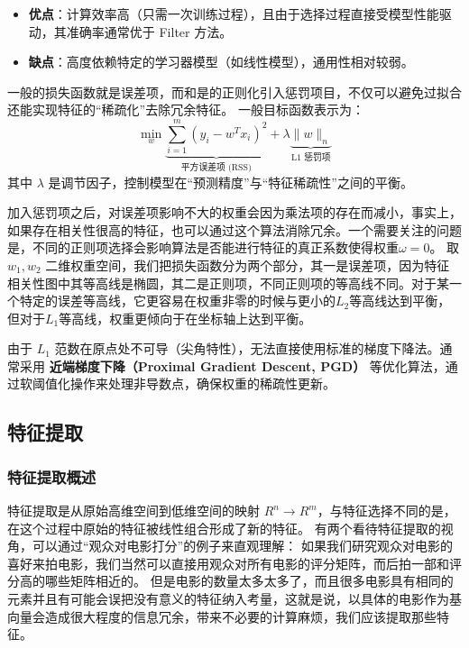 \begin{itemize}
    \item \textbf{优点}：计算效率高（只需一次训练过程），且由于选择过程直接受模型性能驱动，其准确率通常优于 Filter 方法。
    \item \textbf{缺点}：高度依赖特定的学习器模型（如线性模型），通用性相对较弱。
\end{itemize}

\begin{example}
    一般的损失函数就是误差项，而和是的正则化引入惩罚项目，不仅可以避免过拟合还能实现特征的“稀疏化”去除冗余特征。
    一般目标函数表示为：
    \[ \min_{w} \underbrace{\sum_{i=1}^{m} (y_i - w^T x_i)^2}_{\text{平方误差项 (RSS)}} + \lambda \underbrace{\|w\|_n}_{\text{L1 惩罚项}} \]
    其中 $\lambda$ 是调节因子，控制模型在“预测精度”与“特征稀疏性”之间的平衡。

    加入惩罚项之后，对误差项影响不大的权重会因为乘法项的存在而减小，事实上，如果存在相关性很高的特征，也可以通过这个算法消除冗余。一个需要关注的问题是，不同的正则项选择会影响算法是否能进行特征的真正系数使得权重$\omega = 0$。
    取$w_1, w_2$ 二维权重空间，我们把损失函数分为两个部分，其一是误差项，因为特征相关性图中其等高线是椭圆，其二是正则项，不同正则项的等高线不同。对于某一个特定的误差等高线，它更容易在权重非零的时候与更小的$L_2$等高线达到平衡，但对于$L_1$等高线，权重更倾向于在坐标轴上达到平衡。

    由于 $L_1$ 范数在原点处不可导（尖角特性），无法直接使用标准的梯度下降法。通常采用 \textbf{近端梯度下降（Proximal Gradient Descent, PGD）} 等优化算法，通过软阈值化操作来处理非导数点，确保权重的稀疏性更新。
\end{example}

\subsection{特征提取}
\subsubsection{特征提取概述}
特征提取是从原始高维空间到低维空间的映射 $R^n \to R^m$，与特征选择不同的是，在这个过程中原始的特征被线性组合形成了新的特征。
有两个看待特征提取的视角，可以通过“观众对电影打分”的例子来直观理解：
如果我们研究观众对电影的喜好来拍电影，我们当然可以直接用观众对所有电影的评分矩阵，而后拍一部和评分高的哪些矩阵相近的。
但是电影的数量太多太多了，而且很多电影具有相同的元素并且有可能会误把没有意义的特征纳入考量，这就是说，以具体的电影作为基向量会造成很大程度的信息冗余，带来不必要的计算麻烦，我们应该提取那些特征。

